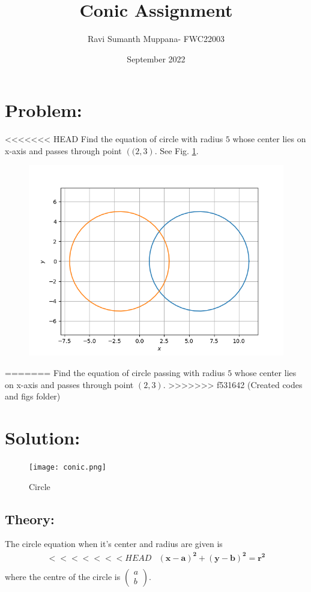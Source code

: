 \documentclass[a4paper,12pt,twocolumn]{article}
\title{Conic Assignment}
\author{Ravi Sumanth Muppana- FWC22003}
\date{September 2022}
\let\vec\mathbf
\newcommand{\myvec}[1]{\ensuremath{\begin{pmatrix}#1\end{pmatrix}}}
\providecommand{\brak}[1]{\ensuremath{\left((#1\right)}}
\begin{document}
\maketitle
\section{Problem:}
<<<<<<< HEAD
Find the equation of circle with radius $5$ whose center lies on x-axis and passes through point $\brak{2,3}$.
\fi
\solution 
See Fig. 
		\ref{fig:11/11/1/12}.
	\begin{figure}[!ht]
		\centering
 \includegraphics[width=\columnwidth]{chapters/11/11/1/12/figs/conic.png}
		\caption{}
		\label{fig:11/11/1/12}
  	\end{figure}
\iffalse
=======
Find the equation of circle passing with radius $5$ whose center lies on x-axis and passes through point $(2,3)$.
>>>>>>> f531642 (Created codes and figs folder)
\maketitle
\section{Solution:}
\begin{figure}[h]
	\texttt{[image: conic.png]}
\caption{Circle}
\end{figure}
\subsection{Theory:}
The circle equation when it's center and radius are given is
\begin{align}
<<<<<<< HEAD
	&\vec{(x-a)^2} + \vec{(y-b)^2} = \vec{r^2}\\
\end{align}
where the centre of the circle is $\myvec{a\\b}$.
\end{document}
